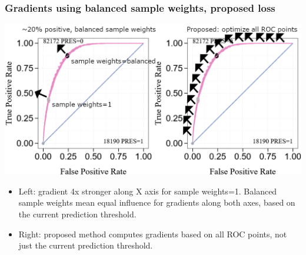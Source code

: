\documentclass[t]{beamer}
\begin{document}
\begin{frame}
  \frametitle{Gradients using balanced sample weights, proposed loss}
  \includegraphics[width=\textwidth]{roc-gradient-arrows-proposed}
  \begin{itemize}
  \item Left: gradient 4x
    stronger along X axis for sample weights=1. Balanced sample
    weights mean equal influence for gradients along both axes, based on the current prediction threshold.
  \item Right: proposed method computes gradients based on all ROC
    points, not just the current prediction threshold.
  \end{itemize}
\end{frame}
\end{document}

